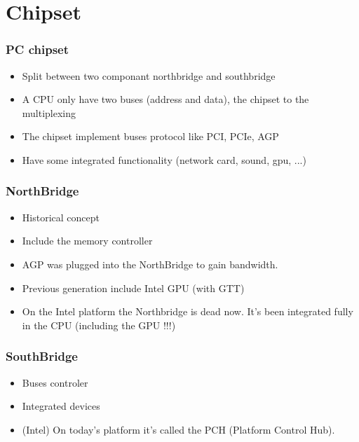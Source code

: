 \section{Chipset}
        \begin{frame}
                \frametitle{PC chipset}
                \begin{itemize}
                        \item Split between two componant northbridge and southbridge
                        \item A CPU only have two buses (address and
                        data), the chipset to the multiplexing
                        \item The chipset implement buses protocol like
                        PCI, PCIe, AGP
                        \item Have some integrated functionality
                        (network card, sound, gpu, ...)
                \end{itemize}
        \end{frame}

        \begin{frame}
                \frametitle{NorthBridge}
                \begin{itemize}
                        \item Historical concept
                        \item Include the memory controller
                        \item AGP was plugged into the NorthBridge to
                        gain bandwidth.
                        \item Previous generation include Intel GPU (with GTT)
                        \item On the Intel platform the Northbridge is
                        dead now. It's been integrated fully in the CPU
                        (including the GPU !!!)
                \end{itemize}
        \end{frame}


        \begin{frame}
                \frametitle{SouthBridge}
                \begin{itemize}
                        \item Buses controler
                        \item Integrated devices
                        \item (Intel) On today's platform it's called
                        the PCH (Platform Control Hub).
                \end{itemize}
        \end{frame}

